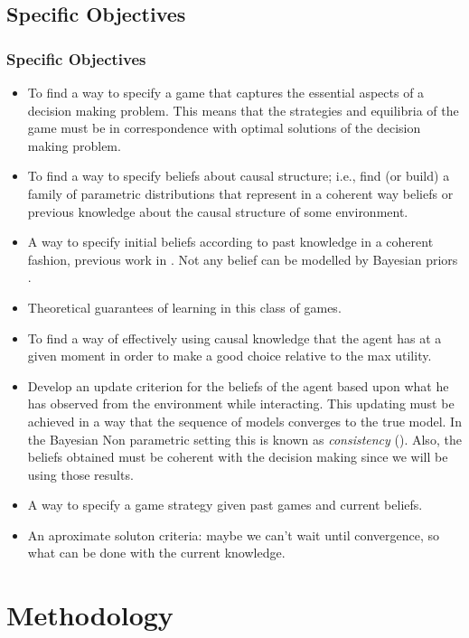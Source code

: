 \documentclass{beamer}
\theoremstyle{plain}
\begin{document}
	\subsection{Specific Objectives}
	\begin{frame}[allowframebreaks]
	\frametitle{Specific Objectives}
	\begin{itemize}
	\item To find a way to specify a game that captures the essential aspects of a decision making problem. This means that the strategies and equilibria of the game must be in correspondence with optimal solutions of the decision making problem.
\item To find a way to specify beliefs about causal structure; i.e., find (or build) a family of parametric distributions that represent in a coherent way beliefs or previous knowledge about the causal structure of some environment.
\item A way to specify initial beliefs according to past knowledge in a coherent fashion, previous work in \cite{billot2005probabilities}. Not any belief can be modelled by Bayesian priors  \cite{gilboa2016ambiguity}.
\item Theoretical guarantees of learning in this class of games.
\item To find a way of effectively using causal knowledge that the agent has at a given moment in order to make a good choice relative to the max utility.
\item Develop an update criterion for the beliefs of the agent based upon what he has observed from the environment while interacting. This updating must be achieved in a way that the sequence of models converges to the true model. In the Bayesian Non parametric setting this is known as \textit{consistency} (\cite{ghosal2017fundamentals}). Also, the beliefs obtained must be coherent with the decision making since we will be using those results. 
\item A way to specify a game strategy given past games and current beliefs.
\item An aproximate soluton criteria: maybe we can't wait until convergence, so what can be done with the current knowledge.
\end{itemize}
	\end{frame}
	
\section{Methodology}
\end{document}
